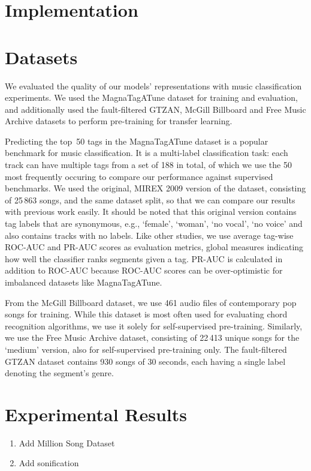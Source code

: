 \documentclass{report}
\begin{document}
\chapter{Implementation}

\chapter{Datasets}
We evaluated the quality of our models' representations with music classification experiments. We used the MagnaTagATune\cite{law2009evaluation} dataset for training and evaluation, and additionally used the fault-filtered GTZAN\cite{tzanetakis2002musical,sturm2013gtzan}, McGill Billboard\cite{burgoyne_billboard} and Free Music Archive\cite{fma_dataset} datasets to perform pre-training for transfer learning. 

Predicting the top~50 tags in the Magna\-Tag\-A\-Tune dataset is a popular benchmark for music classification. It is a multi-label classification task: each track can have multiple tags from a set of 188 in total, of which we use the 50 most frequently occuring to compare our performance against supervised benchmarks. 
We used the original, MIREX 2009 version of the dataset, consisting of 25\,863 songs, and the same dataset split, so that we can compare our results with previous work\cite{pons_end--end_2017, lee2018samplecnn, dieleman_feature_learning} easily. It should be noted that this original version contains tag labels that are synonymous, e.g., `female', `woman', `no vocal', `no voice' and also contains tracks with no labels.
Like other studies, we use average tag-wise ROC-AUC and PR-AUC scores as evaluation metrics, global measures indicating how well the classifier ranks segments given a tag. PR-AUC is calculated in addition to ROC-AUC because ROC-AUC scores can be over-optimistic for imbalanced datasets like MagnaTagATune\cite{pons_end--end_2017}. 

From the McGill Billboard dataset, we use 461 audio files of contemporary pop songs for training. While this dataset is most often used for evaluating chord recognition algorithms, we use it solely for self-supervised pre-training.
Similarly, we use the Free Music Archive dataset, consisting of 22\,413 unique songs for the `medium' version, also for self-supervised pre-training only. The fault-filtered GTZAN dataset contains 930 songs of 30 seconds, each having a single label denoting the segment's genre.



\chapter{Experimental Results}
\begin{enumerate}
    \item Add Million Song Dataset
    \item Add sonification
\end{enumerate}
\end{document}
